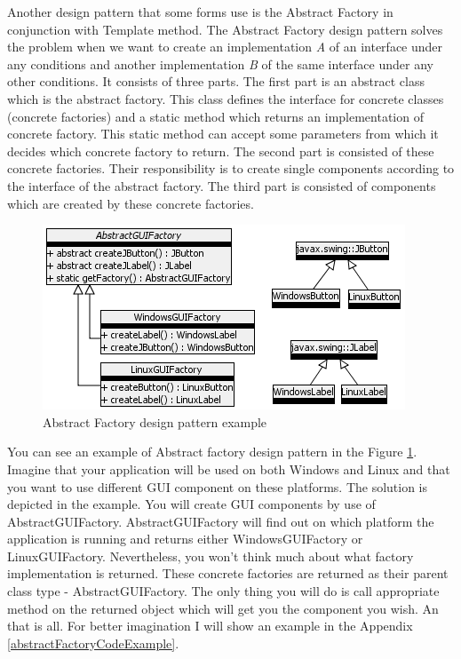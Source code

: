 Another design pattern that some forms use is the Abstract Factory in conjunction with Template method. The Abstract Factory design pattern solves the problem when we want to create an implementation \textit{A} of an interface under any conditions and another implementation \textit{B} of the same interface under any other conditions. It consists of three parts. The first part is an abstract class which is the abstract factory. This class defines the interface for concrete classes (concrete factories) and a static method which returns an implementation of concrete factory. This static method can accept some parameters from which it decides which concrete factory to return. The second part is consisted of these concrete factories. Their responsibility is to create single components according to the interface of the abstract factory. The third part is consisted of components which are created by these concrete factories.

\begin{figure}[!ht]
\begin{center}
\includegraphics[]{img/AbstractFactoryExample.png}
\caption{Abstract Factory design pattern example}
\label{f-AbstractFactoryExample}
\end{center}
\end{figure}

You can see an example of Abstract factory design pattern in the Figure \ref{f-AbstractFactoryExample}. Imagine that your application will be used on both Windows and Linux and that you want to use different GUI component on these platforms. The solution is depicted in the example. You will create GUI components by use of AbstractGUIFactory. AbstractGUIFactory will find out on which platform the application is running and returns either WindowsGUIFactory or LinuxGUIFactory. Nevertheless, you won't think much about what factory implementation is returned. These concrete factories are returned as their parent class type - AbstractGUIFactory. The only thing you will do is call appropriate method on the returned object which will get you the component you wish. An that is all. For better imagination I will show an example in the Appendix \ref{abstractFactoryCodeExample}.


